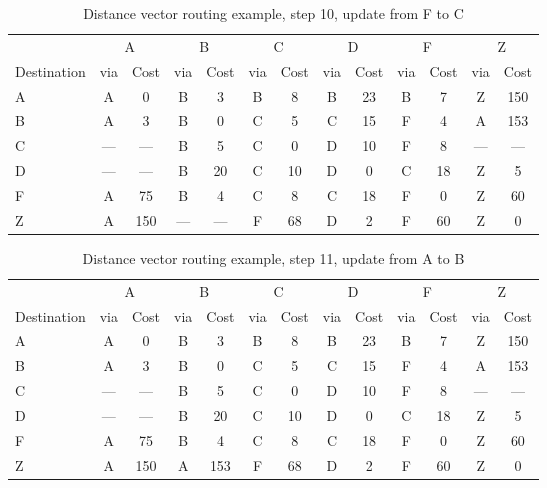 \begin{table}
    \caption{Distance vector  routing example, step 10, update from F to C }
    \label{tab:dv:step:10}
\begin{tabular}{l|c|c|c|c|c|c|c|c|c|c|c|c}
    \toprule
      & \multicolumn{2}{c|}{A}&\multicolumn{2}{c|}{B}&\multicolumn{2}{c|}{C}&\multicolumn{2}{c|}{D}&\multicolumn{2}{c|}{F}&\multicolumn{2}{c|}{Z} \\
    Destination & via&Cost&via&Cost&via&Cost&via&Cost&via&Cost&via&Cost \\ 
    \midrule
    A & A & 0 &B & 3 &B & 8 &B & 23 &B & 7 &Z & 150 
 \\B & A & 3 &B & 0 &C & 5 &C & 15 &F & 4 &A & 153 
 \\C & --- & ---&B & 5 &C & 0 &D & 10 &F & 8 &--- & ---
 \\D & --- & ---&B & 20 &C & 10 &D & 0 &C & 18 &Z & 5 
 \\F & A & 75 &B & 4 &C & 8 &C & 18 &F & 0 &Z & 60 
 \\Z & A & 150 &--- & ---&F & 68 &D & 2 &F & 60 &Z & 0 
    \\ \bottomrule 
\end{tabular}
\end{table}
    

\begin{table}
    \caption{Distance vector  routing example, step 11, update from A to B }
    \label{tab:dv:step:11}
\begin{tabular}{l|c|c|c|c|c|c|c|c|c|c|c|c}
    \toprule
      & \multicolumn{2}{c|}{A}&\multicolumn{2}{c|}{B}&\multicolumn{2}{c|}{C}&\multicolumn{2}{c|}{D}&\multicolumn{2}{c|}{F}&\multicolumn{2}{c|}{Z} \\
    Destination & via&Cost&via&Cost&via&Cost&via&Cost&via&Cost&via&Cost \\ 
    \midrule
    A & A & 0 &B & 3 &B & 8 &B & 23 &B & 7 &Z & 150 
 \\B & A & 3 &B & 0 &C & 5 &C & 15 &F & 4 &A & 153 
 \\C & --- & ---&B & 5 &C & 0 &D & 10 &F & 8 &--- & ---
 \\D & --- & ---&B & 20 &C & 10 &D & 0 &C & 18 &Z & 5 
 \\F & A & 75 &B & 4 &C & 8 &C & 18 &F & 0 &Z & 60 
 \\Z & A & 150 &A & 153 &F & 68 &D & 2 &F & 60 &Z & 0 
    \\ \bottomrule 
\end{tabular}
\end{table}
    

